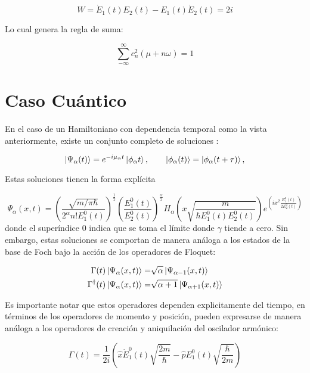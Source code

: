 \documentclass[a4paper,10pt]{report}
\begin{document}
\begin{equation}
W = \dot{E}_1(t)E_2(t)-E_1(t)\dot{E}_2(t) = 2i
\end{equation}

Lo cual genera la regla de suma:

\begin{equation}
\sum_{-\infty}^\infty c_n^2(\mu + n\omega) = 1
\end{equation}

\section{Caso Cuántico}

En el caso de un Hamiltoniano con dependencia temporal como la vista anteriormente, existe un conjunto completo de soluciones \cite{BarnettSD}:

\begin{equation}
\Ket{\Psi_\alpha (t)} = e^{-i\mu_\alpha t}\Ket{\phi_\alpha t}, \qquad \Ket{\phi_\alpha (t)}=\Ket{\phi_\alpha (t+\tau)},
\end{equation}

Estas soluciones tienen la forma explícita\cite{BrownPT}

\begin{equation}
\Psi_\alpha (x,t) = (\frac{\sqrt{m/\pi\hbar}}{2^\alpha n!E_1^0(t)})^{\frac{1}{2}}(\frac{E_1^0(t)}{E_2^0(t)})^\frac{\alpha}{2}H_\alpha(x\sqrt{\frac{m}{\hbar E_1^0(t) E_2^0(t)}})e^{(ix^2\frac{E_1^0(t)}{2E_2^0(t)})}
\end{equation} donde el superíndice 0 indica que se toma el límite donde $\gamma$ tiende a cero. Sin embargo, estas soluciones se comportan de manera análoga a los estados de la base de Foch bajo la acción de los operadores de Floquet:

\begin{align*}\label{FloquetOperators}
\Gamma(t) \Ket{\Psi_\alpha (x,t)} =& \sqrt{\alpha}\Ket{\Psi_{\alpha-1} (x,t)} \\
\Gamma^\dagger(t) \Ket{\Psi_\alpha (x,t)} =& \sqrt{\alpha+1}\Ket{\Psi_{\alpha+1} (x,t)}
\end{align*}

Es importante notar que estos operadores dependen explicitamente del tiempo, en términos de los operadores de momento y posición, pueden expresarse de manera análoga a los operadores de creación y aniquilación del oscilador armónico:

\begin{equation}
\Gamma(t) = \frac{1}{2i}(\hat{x}\dot{E}_1^0(t)\sqrt{\frac{2m}{\hbar}}-\hat{p}E_1^0(t)\sqrt{\frac{\hbar}{2m}})
\end{equation}
\end{document}
